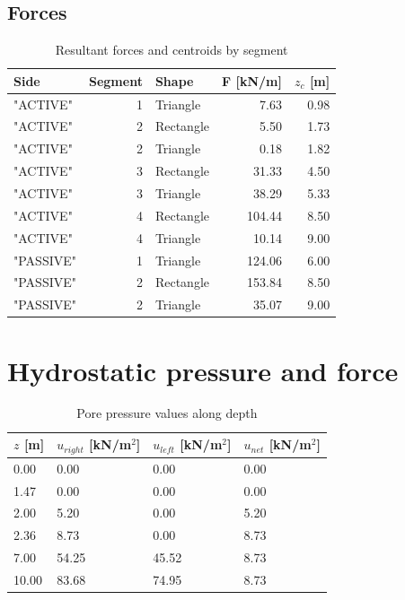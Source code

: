 \subsection{Forces}

\begin{table}[H]
  \centering
  \caption{Resultant forces and centroids by segment}
  \label{tab:appendix_forces_centroids}
  \small
  \setlength{\tabcolsep}{8pt}
  \renewcommand{\arraystretch}{1.15}
  \begin{tabular}{@{}l r l r r@{}}
    \toprule
    Side & Segment & Shape &
    F [kN/m] & $z_c$ [m] \\
    \midrule
    "ACTIVE" & 1 & Triangle  &  7.63 & 0.98 \\
    "ACTIVE" & 2 & Rectangle &  5.50 & 1.73 \\
    "ACTIVE" & 2 & Triangle  &  0.18 & 1.82 \\
    "ACTIVE" & 3 & Rectangle & 31.33 & 4.50 \\
    "ACTIVE" & 3 & Triangle  & 38.29 & 5.33 \\
    "ACTIVE" & 4 & Rectangle & 104.44 & 8.50 \\
    "ACTIVE" & 4 & Triangle  & 10.14 & 9.00 \\
    "PASSIVE" & 1 & Triangle  & 124.06 & 6.00 \\
    "PASSIVE" & 2 & Rectangle & 153.84 & 8.50 \\
    "PASSIVE" & 2 & Triangle  &  35.07 & 9.00 \\
    \bottomrule
  \end{tabular}
\end{table}

\section{Hydrostatic pressure and force}

\begin{table}[H]
  \centering
  \caption{Pore pressure values along depth}
  \label{tab:appenidx_u_profile}
  \small
  \setlength{\tabcolsep}{8pt}
  \renewcommand{\arraystretch}{1.15}
  \begin{tabular}{@{}l l l l@{}}
    \toprule
    \textbf{$z$ [m]} &
    \textbf{$u_{right}$ [kN/m$^2$]} &
    \textbf{$u_{left}$ [kN/m$^2$]} &
    \textbf{$u_{net}$ [kN/m$^2$]} \\
    \midrule
     0.00  &  0.00  &  0.00  &  0.00 \\
     1.47  &  0.00  &  0.00  &  0.00 \\
     2.00  &  5.20  &  0.00  &  5.20 \\
     2.36  &  8.73  &  0.00  &  8.73 \\
     7.00  & 54.25  & 45.52  &  8.73 \\
    10.00  & 83.68  & 74.95  &  8.73 \\
    \bottomrule
  \end{tabular}
\end{table}

